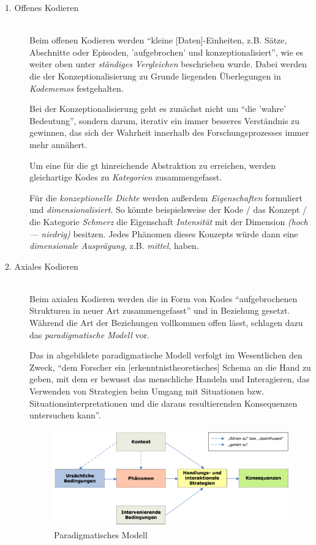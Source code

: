 \begin{description}
  \item[1. Offenes Kodieren] \hfill \\
  Beim offenen Kodieren werden ``kleine [Daten]-Einheiten, z.B. Sätze, Abschnitte oder Episoden, 'aufgebrochen' und konzeptionalisiert'', wie es weiter oben unter \textit{ständiges Vergleichen} beschrieben wurde. Dabei werden die der Konzeptionalisierung zu Grunde liegenden Überlegungen in \textit{Kodememos} festgehalten.
  
  Bei der Konzeptionalisierung geht es zunächst nicht um ``die 'wahre' Bedeutung'', sondern darum, iterativ ein immer besseres Verständnis zu gewinnen, das sich der Wahrheit innerhalb des Forschungsprozesses immer mehr annähert.
  
  Um eine für die \gls{gt} hinreichende Abstraktion zu erreichen, werden gleichartige Kodes zu \textit{Kategorien} zusammengefasst.
  
  Für die \textit{konzeptionelle Dichte} werden außerdem \textit{Eigenschaften} formuliert und \textit{dimensionalisiert}. So könnte beispielsweise der Kode / das Konzept / die Kategorie \textit{Schmerz} die Eigenschaft \textit{Intensität} mit der Dimension \textit{(hoch --- niedrig)} besitzen. Jedes Phänomen dieses Konzepts würde dann eine \textit{dimensionale Ausprägung}, z.B. \textit{mittel}, haben.    
  
  \item[2. Axiales Kodieren] \hfill \\
  Beim axialen Kodieren werden die in Form von Kodes ``aufgebrochenen Strukturen in neuer Art zusammengefasst'' und in Beziehung gesetzt. Während \cite{glaser1978theoretical} die Art der Beziehungen vollkommen offen lässt, schlagen \cite{strauss1990basics} dazu das \textit{paradigmatische Modell} vor.
  
  Das in  abgebildete paradigmatische Modell verfolgt im Wesentlichen den Zweck, ``dem Forscher ein [erkenntnistheoretisches] Schema an die Hand zu geben, mit dem er bewusst das menschliche Handeln und Interagieren, das Verwenden von Strategien beim Umgang mit Situationen bzw. Situationsinterpretationen und die daraus resultierenden Konsequenzen untersuchen kann''.

\begin{figure}
  \centering
    \includegraphics[width=0.75\linewidth]{Figures/paradigmatisches-modell.png}
  \caption[Paradigmatisches Modell]{Paradigmatisches Modell \citep[][S. 67]{Salinger:2013vd}}
  \label{fig:paradigmatisches-modell}
\end{figure}
  

\end{description}
